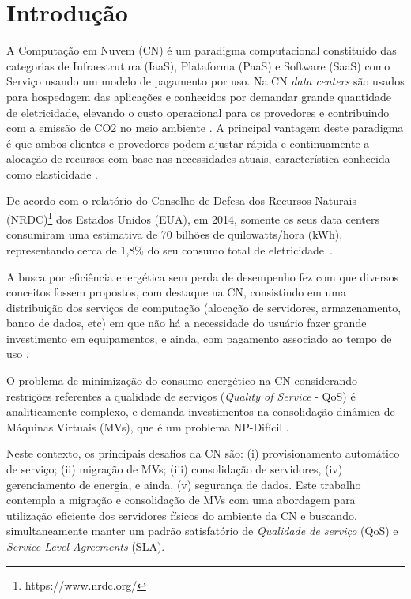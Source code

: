 \documentclass[tcc,capa]{texufpel}
\begin{document}
\tableofcontents

\chapter{Introdução} \label{capIntroducao}

A Computação em Nuvem (CN) é um paradigma computacional constituído das categorias de Infraestrutura (IaaS), Plataforma (PaaS) e Software (SaaS) como Serviço usando um modelo de pagamento por uso. Na CN \textit{data centers} são usados para hospedagem das aplicações e conhecidos por demandar grande quantidade de eletricidade, elevando o custo operacional para os provedores e contribuindo com a emissão de CO2 no meio ambiente \cite{ToosiAndBuyya2015}. A principal vantagem deste paradigma é que ambos clientes e provedores podem ajustar rápida e continuamente a alocação de recursos com base nas necessidades atuais, característica conhecida como elasticidade \cite{mell2011nist}.

De acordo com o relatório do Conselho de Defesa dos Recursos Naturais (NRDC)\footnote{https://www.nrdc.org/} dos Estados Unidos (EUA), em 2014, somente os seus data centers consumiram uma estimativa de 70 bilhões de quilowatts/hora (kWh), representando cerca de 1,8\% do seu consumo total de eletricidade~\cite{shehabi2016united}.

A busca por eficiência energética sem perda de desempenho fez com que diversos conceitos fossem propostos, com destaque na CN, consistindo em uma distribuição dos serviços de computação (alocação de servidores, armazenamento, banco de dados, etc) em que não há a necessidade do usuário fazer grande investimento em equipamentos, e ainda, com pagamento associado ao tempo de uso \cite{nathani2012policy}.

O problema de minimização do consumo energético na CN considerando restrições referentes a qualidade de serviços (\textit{Quality of Service} - QoS) é analiticamente complexo, e demanda investimentos na consolidação dinâmica de Máquinas Virtuais (MVs), que é um problema NP-Difícil \cite{HiltunenEtAl2010, BeloglazovAndBuyya2013}.

Neste contexto, os principais desafios da CN são: (i) provisionamento automático de serviço; (ii) migração de MVs; (iii) consolidação de servidores, (iv) gerenciamento de energia, e ainda, (v) segurança de dados. Este trabalho contempla a migração e consolidação de MVs com uma abordagem para utilização eficiente dos servidores físicos do ambiente da CN e buscando, simultaneamente manter um padrão satisfatório de \textit{Qualidade de serviço} (QoS)  e \textit{Service Level Agreements} (SLA).
\end{document}
